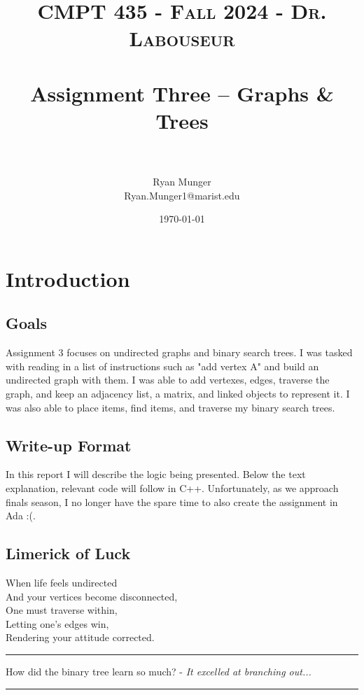\documentclass[letterpaper, 10pt]{article}
\title{	
   \normalfont \normalsize 
   \textsc{CMPT 435 - Fall 2024 - Dr. Labouseur} \\[10pt] %
   \horrule{0.5pt} \\[0.25cm] 	%
   \huge Assignment Three -- Graphs \& Trees\\     	    %
   \horrule{0.5pt} \\[0.25cm] 	%
}
\author{Ryan Munger \\ \normalsize Ryan.Munger1@marist.edu}
\date{\normalsize\today} 	%
\begin{document}
\maketitle %


\section{Introduction}
\subsection{Goals}
Assignment 3 focuses on undirected graphs and binary search trees. I was tasked with reading in a list of instructions such as "add vertex A" and build an undirected graph with them. I was able to add vertexes, edges, traverse the graph, and keep an adjacency list, a matrix, and linked objects to represent it. I was also able to place items, find items, and traverse my binary search trees. 
\subsection{Write-up Format}
    In this report I will describe the logic being presented. Below the text explanation, relevant code will follow in C++. Unfortunately, as we approach finals season, I no longer have the spare time to also create the assignment in Ada :(. 
\subsection{Limerick of Luck}
\noindent
When life feels undirected \\
And your vertices become disconnected, \\
    \hspace*{1.5em}One must traverse within, \\
    \hspace*{1.5em}Letting one's edges win, \\
Rendering your attitude corrected. \\

\hrule
\vspace{.25cm}
How did the binary tree learn so much? - \textit{It excelled at branching out...}\\
\hrule
\vspace{.25cm}
\end{document}
